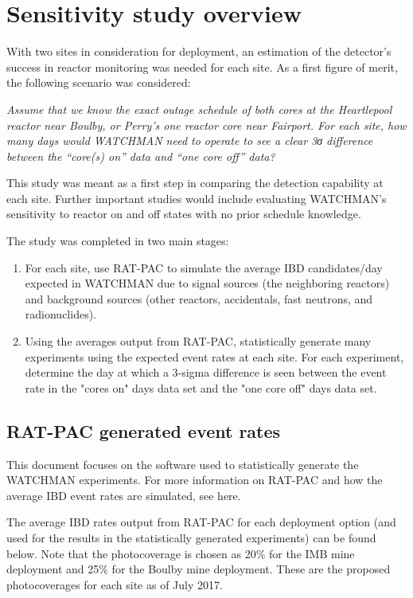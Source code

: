 \documentclass{article}
\begin{document}
\section{Sensitivity study overview}

With two sites in consideration for deployment, an estimation of the 
detector's success in reactor monitoring was needed for each site.
As a first figure of merit, the following scenario was considered:

\vspace{1cm}
\textit{Assume that we know the exact outage schedule of both cores at the 
    Heartlepool reactor near Boulby, or Perry’s one reactor core near
    Fairport.  For each site, how many days would WATCHMAN need to 
    operate to see a clear 3σ difference between the “core(s) on” data
    and “one core off” data?}
\vspace{1cm}

This study was meant as a first step in comparing the detection capability
at each site.  Further important studies would include evaluating
WATCHMAN's sensitivity to reactor on and off states with no prior
schedule knowledge.

The study was completed in two main stages:
\begin{enumerate}
    \item For each site, use RAT-PAC to simulate 
        the average IBD candidates/day expected in WATCHMAN
        due to signal sources (the neighboring reactors) and background
        sources (other reactors, accidentals, fast neutrons, and
        radionuclides).
    \item Using the averages output from RAT-PAC, statistically generate
        many experiments using the expected event rates at each site.  
        For each experiment, determine the day at which a 3-sigma difference
        is seen between the event rate in the "cores on" days data set and
        the "one core off" days data set.
\end{enumerate}

\subsection{RAT-PAC generated event rates}
This document focuses on the software used to statistically generate the
WATCHMAN experiments.  For more information on RAT-PAC and how the 
average IBD event rates are simulated, see here.

The average IBD rates output from RAT-PAC for each deployment option
(and used for the results in the statistically generated experiments)
can be found below.  Note that the photocoverage is chosen as 20\% for the
IMB mine deployment and 25\% for the Boulby mine deployment.  These are
the proposed photocoverages for each site as of July 2017.
\end{document}
